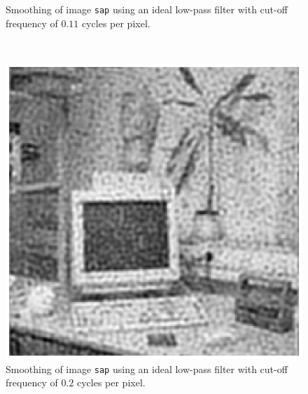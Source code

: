 \begin{minipage}{\linewidth}
\begin{minipage}{0.4\linewidth}
\begin{figure}[H]
      \caption{Smoothing of image \texttt{sap} using an ideal low-pass filter with cut-off frequency of $0.11$ cycles per pixel.}
      \label{fig:Q17_ideal_sap_01}
    \end{figure}
  \end{minipage}
\end{minipage}
\\


\begin{minipage}{\linewidth}
  \begin{minipage}{0.4\linewidth}
    \begin{figure}[H]
      \includegraphics[scale=0.5]{./images/Q17/ideal/sap_02.eps}
      \caption{Smoothing of image \texttt{sap} using an ideal low-pass filter with cut-off frequency of $0.2$ cycles per pixel.}
      \label{fig:Q17_ideal_sap_02}
    \end{figure}
  \end{minipage}
  \hspace{0.05\linewidth}
  \begin{minipage}{0.4\linewidth}
    \begin{figure}[H]

\end{figure}
\end{minipage}
\end{minipage}
